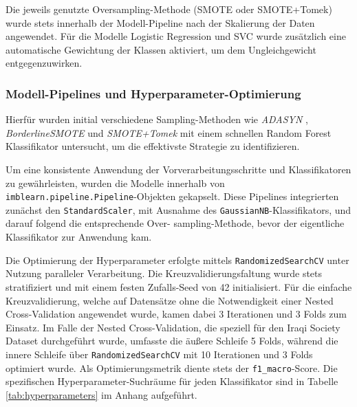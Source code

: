 \documentclass[10pt]{scrartcl}
\begin{document}
Die jeweils genutzte Oversampling-Methode (SMOTE oder SMOTE+Tomek) wurde stets innerhalb der Modell-Pipeline nach der Skalierung der Daten angewendet. Für die Modelle Logistic Regression und SVC wurde zusätzlich eine automatische Gewichtung der Klassen aktiviert, um dem Ungleichgewicht entgegenzuwirken.


\subsubsection{Modell-Pipelines und Hyperparameter-Optimierung}


Hierfür wurden initial verschiedene Sampling-Methoden wie \textit{ADASYN} \cite{He2008}, \textit{BorderlineSMOTE} \cite{Han2005} und \textit{SMOTE+Tomek} mit einem schnellen Random Forest Klassifikator untersucht, um die effektivste Strategie zu identifizieren.

Um eine konsistente Anwendung der Vorverarbeitungsschritte und Klassifikatoren zu gewährleisten, wurden die Modelle innerhalb von \texttt{imblearn.pipeline.Pipeline}-Objekten gekapselt. Diese Pipelines integrierten zunächst den \texttt{StandardScaler}, mit Ausnahme des \texttt{GaussianNB}-Klassifikators, und darauf folgend die entsprechende    Over- sampling-Methode, bevor der eigentliche Klassifikator zur Anwendung kam.


Die Optimierung der Hyperparameter erfolgte mittels \texttt{RandomizedSearchCV} unter Nutzung paralleler Verarbeitung. Die Kreuzvalidierungsfaltung wurde stets stratifiziert und mit einem festen Zufalls-Seed von 42 initialisiert. Für die einfache Kreuzvalidierung, welche auf Datensätze ohne die Notwendigkeit einer Nested Cross-Validation angewendet wurde, kamen dabei 3 Iterationen und 3 Folds zum Einsatz. Im Falle der Nested Cross-Validation, die speziell für den Iraqi Society Dataset durchgeführt wurde, umfasste die äußere Schleife 5 Folds, während die innere Schleife über \newline \texttt{RandomizedSearchCV} mit 10 Iterationen und 3 Folds optimiert wurde. Als Optimierungsmetrik diente stets der \texttt{f1\_macro}-Score. Die spezifischen Hyperparameter-Suchräume für jeden Klassifikator sind in Tabelle \ref{tab:hyperparameters} im Anhang aufgeführt.
\end{document}
